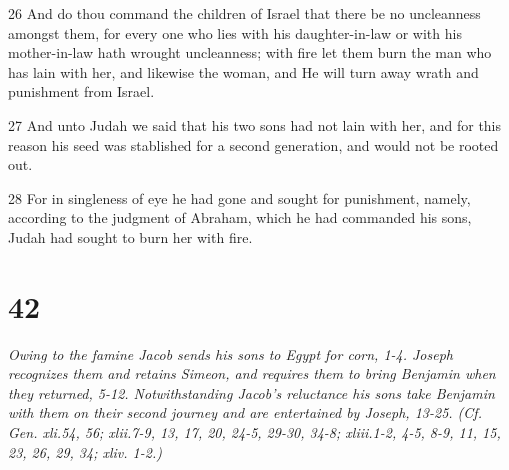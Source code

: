 \par 26 And do thou command the children of Israel that there be no uncleanness amongst them, for every one who lies with his daughter-in-law or with his mother-in-law hath wrought uncleanness; with fire let them burn the man who has lain with her, and likewise the woman, and He will turn away wrath and punishment from Israel.
\par 27 And unto Judah we said that his two sons had not lain with her, and for this reason his seed was stablished for a second generation, and would not be rooted out.
\par 28 For in singleness of eye he had gone and sought for punishment, namely, according to the judgment of Abraham, which he had commanded his sons, Judah had sought to burn her with fire.

\chapter{42}

\par \textit{Owing to the famine Jacob sends his sons to Egypt for corn, 1-4. Joseph recognizes them and retains Simeon, and requires them to bring Benjamin when they returned, 5-12. Notwithstanding Jacob's reluctance his sons take Benjamin with them on their second journey and are entertained by Joseph, 13-25. (Cf. Gen. xli.54, 56; xlii.7-9, 13, 17, 20, 24-5, 29-30, 34-8; xliii.1-2, 4-5, 8-9, 11, 15, 23, 26, 29, 34; xliv. 1-2.)}

